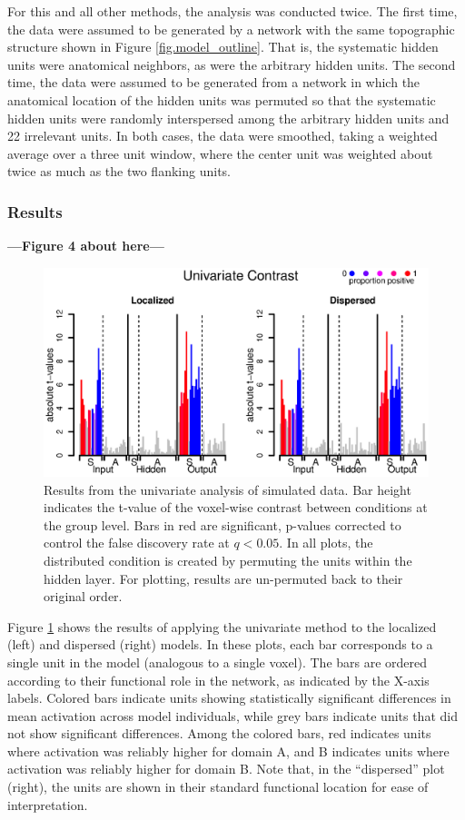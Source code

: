 For this and all other methods, the analysis was conducted twice. The first time, the data were assumed to be generated by a network with the same topographic structure shown in Figure \ref{fig.model_outline}. That is, the systematic hidden units were anatomical neighbors, as were the arbitrary hidden units. The second time, the data were assumed to be generated from a network in which the anatomical location of the hidden units was permuted so that the systematic hidden units were randomly interspersed among the arbitrary hidden units and 22 irrelevant units. In both cases, the data were smoothed, taking a weighted average over a three unit window, where the center unit was weighted about twice as much as the two flanking units.

\subsubsection{Results} 
\textbf{---Figure 4 about here---}
\begin{figure}
\centering
\includegraphics[width=1\textwidth]{figures/univariate.eps}
\caption{\label{fig.univariate} Results from the univariate analysis of simulated data. Bar height indicates the t-value of the voxel-wise contrast between conditions at the group level. Bars in red are significant, p-values corrected to control the false discovery rate at $q<0.05$. In all plots, the distributed condition is created by permuting the units within the hidden layer. For plotting, results are un-permuted back to their original order.}
\end{figure}

Figure \ref{fig.univariate} shows the results of applying the univariate method to the localized (left) and dispersed (right) models. In these plots, each bar corresponds to a single unit in the model (analogous to a single voxel). The bars are ordered according to their functional role in the network, as indicated by the X-axis labels. Colored bars indicate units showing statistically significant differences in mean activation across model individuals, while grey bars indicate units that did not show significant differences. Among the colored bars, red indicates units where activation was reliably higher for domain A, and B indicates units where activation was reliably higher for domain B. Note that, in the ``dispersed'' plot (right), the units are shown in their standard functional location for ease of interpretation.

